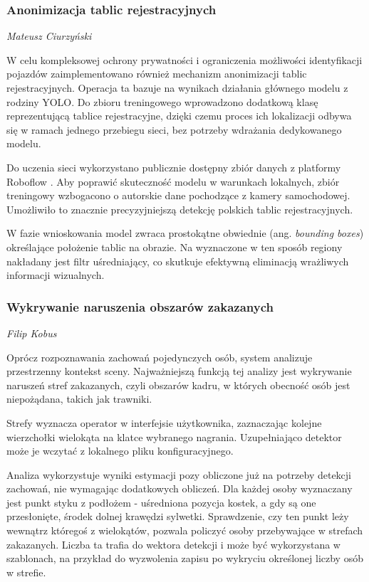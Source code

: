 \subsubsection{Anonimizacja tablic rejestracyjnych}
\small \textit{Mateusz Ciurzyński}

W celu kompleksowej ochrony prywatności i ograniczenia możliwości identyfikacji pojazdów zaimplementowano również mechanizm anonimizacji tablic rejestracyjnych. Operacja ta bazuje na wynikach działania głównego modelu z rodziny YOLO. Do zbioru treningowego wprowadzono dodatkową klasę reprezentującą tablice rejestracyjne, dzięki czemu proces ich lokalizacji odbywa się w ramach jednego przebiegu sieci, bez potrzeby wdrażania dedykowanego modelu.

Do uczenia sieci wykorzystano publicznie dostępny zbiór danych z platformy Roboflow \cite{license-plate-recognition-rxg4e_dataset}. Aby poprawić skuteczność modelu w warunkach lokalnych, zbiór treningowy wzbogacono o autorskie dane pochodzące z kamery samochodowej. Umożliwiło to znacznie precyzyjniejszą detekcję polskich tablic rejestracyjnych.

W fazie wnioskowania model zwraca prostokątne obwiednie (ang. \textit{bounding boxes}) określające położenie tablic na obrazie. Na wyznaczone w ten sposób regiony nakładany jest filtr uśredniający, co skutkuje efektywną eliminacją wrażliwych informacji wizualnych.

\subsubsection{Wykrywanie naruszenia obszarów zakazanych}
\small \textit{Filip Kobus}

Oprócz rozpoznawania zachowań pojedynczych osób, system analizuje przestrzenny kontekst sceny. Najważniejszą funkcją tej analizy jest wykrywanie naruszeń stref zakazanych, czyli obszarów kadru, w których obecność osób jest niepożądana, takich jak trawniki.

Strefy wyznacza operator w interfejsie użytkownika, zaznaczając kolejne wierzchołki wielokąta na klatce wybranego nagrania. Uzupełniająco detektor może je wczytać z lokalnego pliku konfiguracyjnego.

Analiza wykorzystuje wyniki estymacji pozy obliczone już na potrzeby detekcji zachowań, nie wymagając dodatkowych obliczeń. Dla każdej osoby wyznaczany jest punkt styku z podłożem - uśredniona pozycja kostek, a gdy są one przesłonięte, środek dolnej krawędzi sylwetki. Sprawdzenie, czy ten punkt leży wewnątrz któregoś z wielokątów, pozwala policzyć osoby przebywające w strefach zakazanych. Liczba ta trafia do wektora detekcji i może być wykorzystana w szablonach, na przykład do wyzwolenia zapisu po wykryciu określonej liczby osób w strefie.

